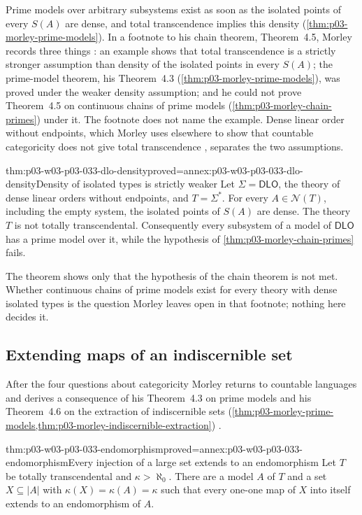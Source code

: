 Prime models over arbitrary subsystems exist as soon as the isolated
points of every \(S(A)\) are dense, and total transcendence implies this
density (\cref{thm:p03-morley-prime-models}). In a footnote to his chain
theorem, Theorem~4.5, Morley records three things \cite[p.~532, n.~21]{Morley1965}:
an example shows that total transcendence is a strictly stronger
assumption than density of the isolated points in every \(S(A)\); the
prime-model theorem, his Theorem~4.3 (\cref{thm:p03-morley-prime-models}), was proved under the weaker density assumption; and
he could not prove Theorem~4.5 on continuous chains of prime models
(\cref{thm:p03-morley-chain-primes}) under it. The footnote does not
name the example. Dense linear order without endpoints, which Morley
uses elsewhere to show that countable categoricity does not give total
transcendence \cite[p.~528]{Morley1965}, separates the two assumptions.

\begin{hbtheorem}{thm:p03-w03-p03-033-dlo-density}{proved=annex:p03-w03-p03-033-dlo-density}{Density of isolated types is strictly weaker}
Let \(\Sigma=\mathsf{DLO}\), the theory of dense linear orders without
endpoints, and \(T=\Sigma^*\). For every \(A\in\mathcal N(T)\), including
the empty system, the isolated points of \(S(A)\) are dense. The theory
\(T\) is not totally transcendental. Consequently every subsystem of a
model of \(\mathsf{DLO}\) has a prime model over it, while the hypothesis
of \cref{thm:p03-morley-chain-primes} fails.
\end{hbtheorem}

The theorem shows only that the hypothesis of the chain theorem is not
met. Whether continuous chains of prime models exist for every theory
with dense isolated types is the question Morley leaves open in that
footnote; nothing here decides it.

\subsection{Extending maps of an indiscernible set}
\label{sec:p03-w03-p03-033-question-five}

After the four questions about categoricity Morley returns to countable
languages and derives a consequence of his Theorem~4.3 on prime models and his
Theorem~4.6 on the extraction of indiscernible sets
(\cref{thm:p03-morley-prime-models,thm:p03-morley-indiscernible-extraction})
\cite[p.~537]{Morley1965}.

\begin{hbtheorem}{thm:p03-w03-p03-033-endomorphism}{proved=annex:p03-w03-p03-033-endomorphism}{Every injection of a large set extends to an endomorphism}
Let \(T\) be totally transcendental and \(\kappa>\aleph_0\). There are a
model \(A\) of \(T\) and a set \(X\subseteq|A|\) with
\(\kappa(X)=\kappa(A)=\kappa\) such that every one-one map of \(X\) into
itself extends to an endomorphism of \(A\).
\end{hbtheorem}

